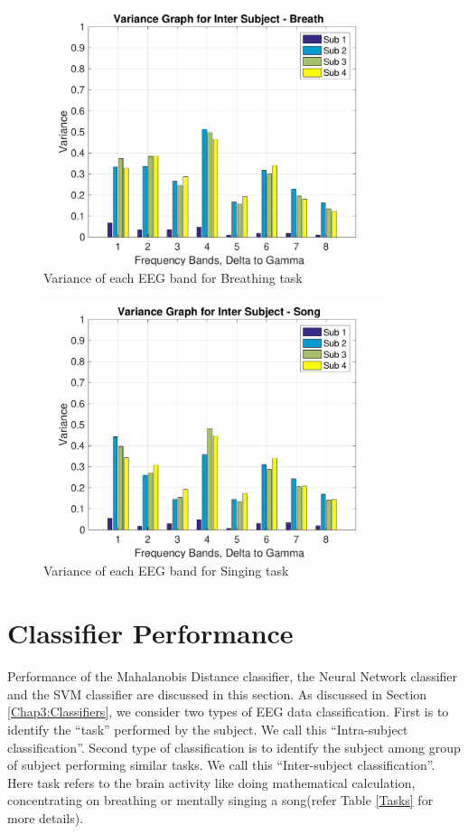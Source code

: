     \begin{figure}[hbtp]
    	\centering
    	\includegraphics[width=0.9\textwidth]{Chapter-4/4}
    	\caption{Variance of each EEG band for Breathing task}
    	\label{fig:chap44}
    \end{figure}

    \begin{figure}[hbtp]
    	\centering
    	\includegraphics[width=0.9\textwidth]{Chapter-4/6}
    	\caption{Variance of each EEG band for Singing task}
    	\label{fig:chap46}
    \end{figure}

    \FloatBarrier

    \section{Classifier Performance}
    Performance of the Mahalanobis Distance classifier, the Neural Network classifier and the SVM classifier are discussed in this section. As discussed in Section \ref{Chap3:Classifiers}, we consider two types of EEG data classification. First is to identify the ``task'' performed by the subject. We call this ``Intra-subject classification''. Second type of classification is to identify the subject among group of subject performing similar tasks. We call this ``Inter-subject classification''. Here task refers to the brain activity like doing mathematical calculation, concentrating on breathing or mentally singing a song(refer Table \ref{Tasks} for more details).
    

